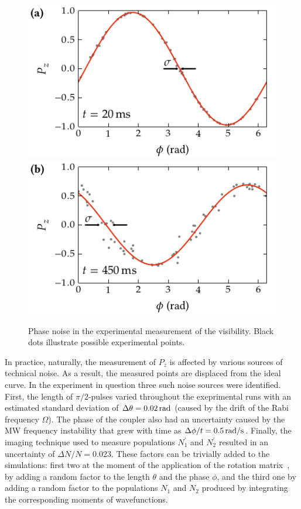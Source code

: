 \begin{figure}
    \centerline{%
    \includegraphics{figures_generated/bec_noise/illustration_noise_20ms.pdf}%
    \includegraphics{figures_generated/bec_noise/illustration_noise_450ms.pdf}}

    \caption{Phase noise in the experimental measurement of the visibility.
    Black dots illustrate possible experimental points.}

    \label{fig:bec-noise:phase-noise:illustration}
\end{figure}

In practice, naturally, the measurement of $P_z$ is affected by various sources of technical noise.
As a result, the measured points are displaced from the ideal curve.
In the experiment in question three such noise sources were identified.
First, the length of $\pi/2$-pulses varied throughout the exeprimental runs with an estimated standard deviation of $\Delta \theta = 0.02\mbox{\ensuremath{\,\mathrm{rad}}}$ (caused by the drift of the Rabi frequency $\Omega$).
The phase of the coupler also had an uncertainty caused by the MW frequency instability that grew with time as $\Delta \phi / t = 0.5\mbox{\ensuremath{\,\mathrm{rad/s}}}$.
Finally, the imaging technique used to measure populations $N_1^\prime$ and $N_2^\prime$ resulted in an uncertainty of $\Delta N / N = 0.023$.
These factors can be trivially added to the simulations: first two at the moment of the application of the rotation matrix~, by adding a random factor to the length $\theta$ and the phase $\phi$, and the third one by adding a random factor to the populations $N_1$ and $N_2$ produced by integrating the corresponding moments of wavefunctions.

